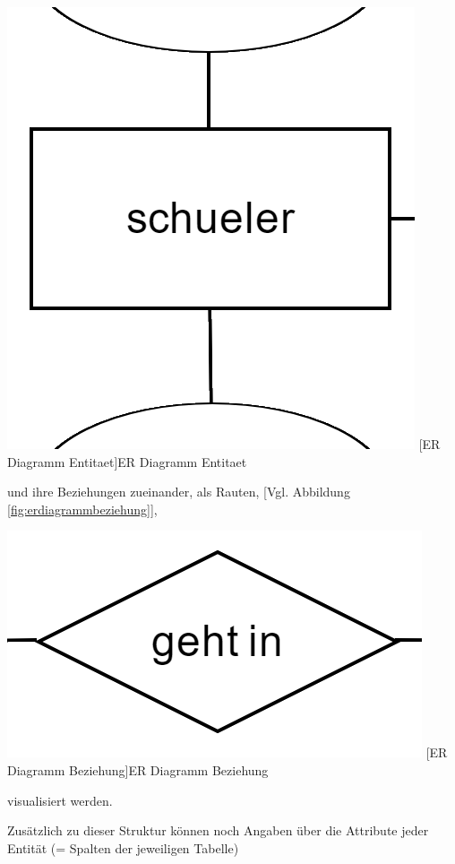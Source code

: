 \documentclass[12pt,a4paper,bibliography=totocnumbered,listof=totocnumbered]{scrartcl}
\begin{document}
\vspace{1em}
\begin{minipage}{\linewidth}
	\centering
	\includegraphics[width=0.6\linewidth]{Bilder/erd-entitaet.png}
	[ER Diagramm Entitaet]{ER Diagramm Entitaet}
	\label{fig:erdiagrammentitaet}
\end{minipage}

und ihre Beziehungen zueinander, als Rauten, [Vgl. Abbildung \ref{fig:erdiagrammbeziehung}],

\vspace{1em}
\begin{minipage}{\linewidth}
	\centering
	\includegraphics[width=0.7\linewidth]{Bilder/erd-beziehung.png}
	[ER Diagramm Beziehung]{ER Diagramm Beziehung}
	\label{fig:erdiagrammbeziehung}
\end{minipage}

visualisiert werden.

Zusätzlich zu dieser Struktur können noch Angaben über die Attribute jeder Entität (= Spalten der jeweiligen Tabelle)
\end{document}

